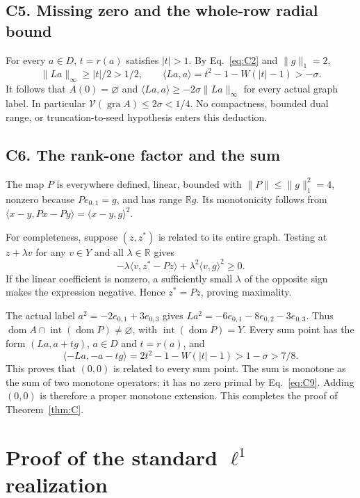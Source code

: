 \documentclass[11pt]{article}
\newcommand{\R}{\mathbb R}
\newcommand{\gra}{\operatorname{gra}}
\newcommand{\dom}{\operatorname{dom}}
\newcommand{\pair}[2]{\langle #1,#2\rangle}
\begin{document}
\subsection{C5. Missing zero and the whole-row radial bound}
\label{sec:C5}
For every $a\in D$, $t=r(a)$ satisfies $|t|>1$. By Eq.~\eqref{eq:C2}
and $\|g\|_1=2$,
\begin{equation}
\|La\|_\infty\ge|t|/2>1/2,\qquad
\pair{La}{a}=t^2-1-W(|t|-1)>-\sigma.
\tag{C9}\label{eq:C9}
\end{equation}
It follows that $A(0)=\varnothing$ and
$\pair{La}{a}\ge-2\sigma\|La\|_\infty$ for every actual graph label.
In particular $\mathcal V(\gra A)\le2\sigma<1/4$. No compactness,
bounded dual range, or truncation-to-seed hypothesis enters this deduction.

\subsection{C6. The rank-one factor and the sum}
\label{sec:C6}
The map $P$ is everywhere defined, linear, bounded with
$\|P\|\le\|g\|_1^2=4$, nonzero because $Pe_{0,1}=g$, and has range $\R g$.
Its monotonicity follows from $\pair{x-y}{Px-Py}=\pair{x-y}{g}^2$.

For completeness, suppose $(z,z^*)$ is related to its entire graph.
Testing at $z+\lambda v$ for any $v\in Y$ and all $\lambda\in\R$ gives
\begin{equation}
-\lambda\pair{v}{z^*-Pz}+\lambda^2\pair{v}{g}^2\ge0.
\tag{C10}\label{eq:C10}
\end{equation}
If the linear coefficient is nonzero, a sufficiently small $\lambda$ of
the opposite sign makes the expression negative. Hence $z^*=Pz$, proving maximality.

The actual label $a^2=-2e_{0,1}+3e_{0,3}$ gives
$La^2=-6e_{0,1}-8e_{0,2}-3e_{0,3}$. Thus
$\dom A\cap\operatorname{int}(\dom P)\ne\varnothing$, with
$\operatorname{int}(\dom P)=Y$. Every sum point has the form
$(La,a+tg)$, $a\in D$ and $t=r(a)$, and
\begin{equation}
\pair{-La}{-a-tg}=2t^2-1-W(|t|-1)>1-\sigma>7/8.
\tag{C11}\label{eq:C11}
\end{equation}
This proves that $(0,0)$ is related to every sum point. The sum is
monotone as the sum of two monotone operators; it has no zero primal by
Eq.~\eqref{eq:C9}. Adding $(0,0)$ is therefore a proper monotone extension.
This completes the proof of Theorem~\ref{thm:C}.

\section{Proof of the standard $\ell^1$ realization}
\label{sec:l1}
\end{document}
